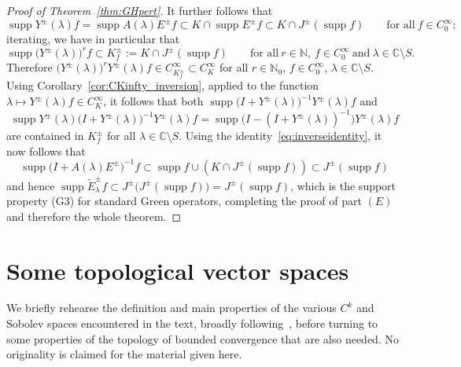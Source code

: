 \documentclass[11pt]{article}
\numberwithin{equation}{section}
\numberwithin{equation}{section}
\newcommand{\CC}{{\mathbb C}}
\newcommand{\NN}{{\mathbb N}}
\DeclareMathOperator{\supp}{supp}
\begin{document}
\begin{proof}[Proof of Theorem~\ref{thm:GHpert}]
 	It further follows that
 	\begin{equation*}
 		\supp Y^\pm(\lambda) f =\supp A(\lambda)E^\pm f\subset K\cap \supp E^\pm f\subset K\cap J^\pm(\supp f)
 		\qquad \text{for all} \ f\in C_0^\infty;
 	\end{equation*}
iterating, we have in particular that
 	\begin{equation*}
 		\supp \big(Y^\pm(\lambda)\big)^r f\subset K^\pm_f:= K\cap J^\pm(\supp f) \qquad \text{for all} \ r\in \NN,\ f\in C_0^\infty \ \text{and} \ \lambda\in\CC\setminus S.
 	\end{equation*}	
 	Therefore $\big(Y^\pm(\lambda)\big)^r Y^\pm(\lambda) f\in C^\infty_{K^\pm_f}\subset C^\infty_K$ for all $r\in\NN_0$, $f\in C_0^\infty$, $\lambda\in \CC\setminus S$.
 	Using Corollary~\ref{cor:CKinfty_inversion}, applied to the function $\lambda\mapsto Y^\pm(\lambda) f\in C^\infty_K$, it follows that both
 	$\supp \big(I+Y^\pm(\lambda)\big)^{-1} Y^\pm(\lambda) f$ and
 	\begin{equation*}
 		\supp Y^\pm(\lambda) \big(I+Y^\pm(\lambda)\big)^{-1} Y^\pm(\lambda) f= \supp \big(I-(I+ Y^\pm(\lambda))^{-1}\big) Y^\pm(\lambda) f
 	\end{equation*}
 	are contained in $K^\pm_f$ for all $\lambda\in \CC\setminus S$. Using the identity~\eqref{eq:inverseidentity},
 	it now follows that
 	\begin{equation*}
 		\supp \big(I+ A(\lambda)E^\pm\big)^{-1} f \subset \supp f\cup \left(K\cap J^\pm(\supp f)\right) \subset
 		J^\pm(\supp f)
 	\end{equation*}
 	and hence $\supp \tilde{E}^\pm_\lambda f \subset J^\pm\big(J^\pm(\supp f)\big)=J^\pm(\supp f)$, which is the support property (G3) for standard Green operators, completing the proof of part $(E)$ and therefore the whole theorem.
 \end{proof}


 \appendix
 \section{Some topological vector spaces}\label{appx:topspaces}

 We briefly rehearse the definition and main properties of the various $C^k$ and Sobolev spaces encountered in the text, broadly following~\cite{Baer:2015,BaerWafo:2015}, before turning to some properties of the topology of bounded convergence that are also needed. No originality is claimed for the material given here.
\end{document}
